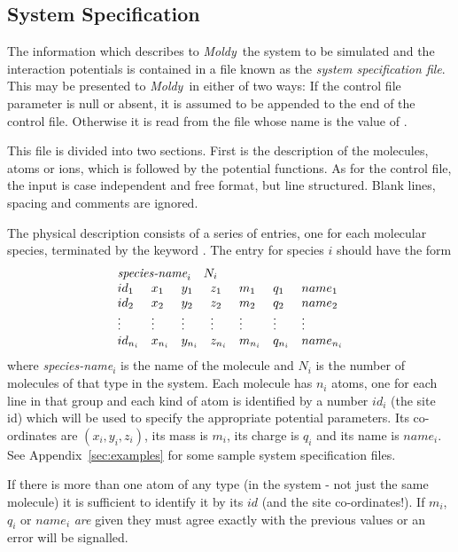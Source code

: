 \documentclass[a4paper,twoside]{report}
\newcommand{\moldy}{\emph{Moldy}}
\begin{document}
\subsection{System Specification}
\label{sec:sys-spec}

The information which describes to \moldy\  the system to be simulated
and the interaction potentials is contained in a file known as the
\emph{system specification file}.  This may be presented to \moldy\  in
either of two ways: If the control file parameter 
is null or absent, it is assumed to be appended to the end of the
control file.  Otherwise it is read from the file whose name is
the value of .

This file is divided into two sections.  First is the description of
the molecules, atoms or ions, which is followed by the potential
functions.  As for the control file, the input is case independent and
free format, but line structured. Blank lines, spacing and comments
are ignored.

\pagebreak[3]
The physical description consists of a series of entries, one for each
molecular species, terminated by the keyword . The entry
for species $i$ should have the form
\begin{displaymath}
\begin{array}{lllllll}
\multicolumn{7}{l}{\textit{species-name}_{i} \quad N_{i}}  \\
id_{1} & x_{1} & y_{1} & z_{1}&  m_{1} & q_{1} & name_{1} \\
id_{2} & x_{2} & y_{2} & z_{2}&  m_{2} & q_{2} & name_{2} \\
\vdots & \vdots & \vdots & \vdots & \vdots & \vdots & \vdots \\
id_{n_{i}} & x_{n_{i}} & y_{n_{i}} & z_{n_{i}}& 
m_{n_{i}} & q_{n_{i}} & name_{n_{i}} \\
\end{array}
\end{displaymath}
where \textit{species-name}$_{i}$ is the name of the molecule and $N_{i}$
is the number of molecules of that type in the system. Each molecule
has $n_{i}$ atoms, one for each line in that group and each kind of
atom is identified by a number $id_{i}$ (the site id) which will be
used to specify the appropriate potential parameters. Its co-ordinates
are $(x_{i},y_{i},z_{i})$, its mass is $m_{i}$, its charge is $q_{i}$
and its name is $name_{i}$.  See Appendix~\ref{sec:examples} for some
sample system specification files.

If there is more than one atom of any type (in the system - not just
the same molecule) it is sufficient to identify it by its $id$ (and
the site co-ordinates!).  If $m_{i}$, $q_{i}$ or $name_{i}$ \emph{are}
given they must agree exactly with the previous values or an error
will be signalled.
\end{document}
